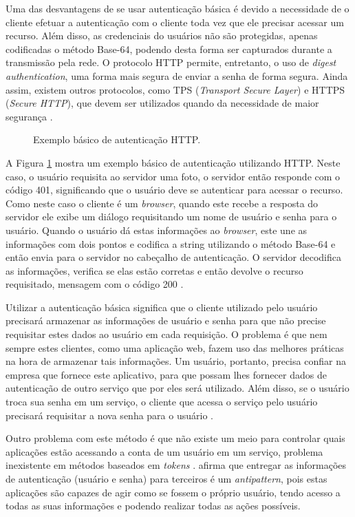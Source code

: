 \documentclass[diss]{template/setrem}
\begin{document}
Uma das desvantagens de se usar autenticação básica é devido a necessidade de o cliente efetuar a autenticação com o cliente toda vez que ele precisar acessar um recurso. Além disso, as credenciais do usuários não são protegidas, apenas codificadas o método Base-64, podendo desta forma ser capturados durante a transmissão pela rede. O protocolo HTTP permite, entretanto, o uso de \emph{digest authentication}, uma forma mais segura de enviar a senha de forma segura. Ainda assim, existem outros protocolos, como TPS (\emph{Transport Secure Layer}) e HTTPS (\emph{Secure HTTP}), que devem ser utilizados quando da necessidade de maior segurança \citep{Gourley2002}.

\begin{figure}[!h]
    \caption{Exemplo básico de autenticação HTTP.}
    \label{fig:http-basic-auth}
\end{figure}

A Figura \ref{fig:http-basic-auth} mostra um exemplo básico de autenticação utilizando HTTP. Neste caso, o usuário requisita ao servidor uma foto, o servidor então responde com o código 401, significando que o usuário deve se autenticar para acessar o recurso. Como neste caso o cliente é um \emph{browser}, quando este recebe a resposta do servidor ele exibe um diálogo requisitando um nome de usuário e senha para o usuário. Quando o usuário dá estas informações ao \emph{browser}, este une as informações com dois pontos e codifica a string utilizando o método Base-64 e então envia para o servidor no cabeçalho de autenticação. O servidor decodifica as informações, verifica se elas estão corretas e então devolve o recurso requisitado, mensagem com o código 200 \citep{Gourley2002}.

Utilizar a autenticação básica significa que o cliente utilizado pelo usuário precisará armazenar as informações de usuário e senha para que não precise requisitar estes dados ao usuário em cada requisição. O problema é que nem sempre estes clientes, como uma aplicação web, fazem uso das melhores práticas na hora de armazenar tais informações. Um usuário, portanto, precisa confiar na empresa que fornece este aplicativo, para que possam lhes fornecer dados de autenticação de outro serviço que por eles será utilizado. Além disso, se o usuário troca sua senha em um serviço, o cliente que acessa o serviço pelo usuário precisará requisitar a nova senha para o usuário \citep{Leblanc2011}.

Outro problema com este método é que não existe um meio para controlar quais aplicações estão acessando a conta de um usuário em um serviço, problema inexistente em métodos baseados em \emph{tokens} \citep{Leblanc2011}. \citet{Bell2009} afirma que entregar as informações de autenticação (usuário e senha) para terceiros é um \emph{antipattern}, pois estas aplicações são capazes de agir como se fossem o próprio usuário, tendo acesso a todas as suas informações e podendo realizar todas as ações possíveis.
\end{document}
